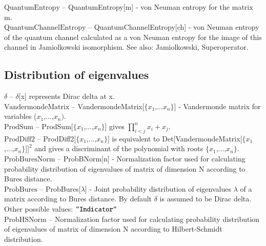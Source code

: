 \noindent\textbf{$ \text{QuantumEntropy} $ }-- QuantumEntropy[m] - von Neuman entropy for the matrix m.$  $\\[6pt]

\noindent\textbf{$ \text{QuantumChannelEntropy} $ }-- QuantumChannelEntropy[ch] - von Neuman entropy of the quantum channel calculated as a von Neuman entropy for the image of this channel in Jamiolkowski isomorphism. See also: Jamiolkowski, Superoperator.$  $\\[6pt]

\subsection{Distribution of eigenvalues}

\noindent\textbf{$ \delta  $ }-- $\delta $[x] represents Dirac delta at x.$  $\\[6pt]

\noindent\textbf{$ \text{VandermondeMatrix} $ }-- VandermondeMatrix[$\{$$ x_1\text{,...}x_n $$\}$] - Vandermonde matrix for variables ($ x_1 $,...,$ x_n\text{).} $\\[6pt]

\noindent\textbf{$ \text{ProdSum} $ }-- ProdSum[$\{$$ x_1 $,...,$ x_n $$\}$] gives $ \prod _{i<j}^nx_i+x_j. $\\[6pt]

\noindent\textbf{$ \text{ProdDiff2} $ }-- ProdDiff2[$\{$$ x_1 $,...,$ x_n $$\}$] is equivalent to Det[VandermondeMatrix[$\{$$ x_1 $,...,$ x_n $$\}$]$ ]^2 $ and gives a discriminant of the polynomial with roots $\{$$ x_1 $,...,$ x_n $$\}$.$  $\\[6pt]

\noindent\textbf{$ \text{ProbBuresNorm} $ }-- ProbBNorm[n] - Normalization factor used for calculating probability distribution of eigenvalues of matrix of dimension N according to Bures distance.$  $\\[6pt]

\noindent\textbf{$ \text{ProbBures} $ }-- ProbBures[$\lambda $] - Joint probability distribution of eigenvalues $\lambda $ of a matrix according to Bures distance. By default $\delta $ is assumed to be Dirac delta. Other possible values: $\texttt{"$ $Indicator$\texttt{"}$} $\\[6pt]

\noindent\textbf{$ \text{ProbHSNorm} $ }-- Normalization factor used for calculating probability distribution of eigenvalues of matrix of dimension N according to Hilbert-Schmidt distribution.$  $\\[6pt]

